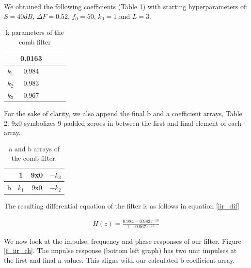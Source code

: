 \documentclass[10pt,a4paper,twocolumn]{article}
\begin{document}
We obtained the following coefficients (Table 1) with starting hyperparameters of: $S = 40dB$, $\Delta F = 0.52$, $f_0 = 50$, $k_0 = 1$ and $L = 3$. 


\begin{table}[!h]
\label{tabl1}
\caption{k parameters of the comb filter}
\begin{tabular}{ccccc}
\hline
\multicolumn{1}{c}{} $\beta$ & 0.0163 &  &  &  \\ \hline
$k_{1}$ & 0.984  &  &  &  \\ \hline
$k_{2}$ & 0.983  &  &  &  \\ \hline
$k_{3}$ & 0.967  &  &  &  \\ \hline
\end{tabular}
\end{table}





For the sake of clarity, we also append the final b and a coefficient arrays, Table 2. 9x0 symbolizes 9 padded zeroes in between the first and final element of each array.

\begin{table}[!h]
\label{tabl2}
\caption{a and b arrays of the comb filter.}
\begin{tabular}{cccc}
\hline
\multicolumn{1}{c}{} a & 1   & 9x0 & $-k_{3}$  \\ \hline
b & $k_{1}$ & 9x0 & $-k_{2}$ \\ \hline
\end{tabular}
\end{table}

The resulting differential equation of the filter is as follows in equation \ref{iir_dif}

\begin{eqnarray}
H(z) = \frac{0.984 - 0.983z^{-10}}{1 - 0.967z^{-10}}
\label{iir_dif}
\end{eqnarray}



We now look at the impulse, frequency and phase responses of our filter. Figure \ref{f_iir_ch}. The impulse response (bottom left graph) has two unit impulses at the first and final n values. This aligns with our calculated b coefficient array.
\end{document}
